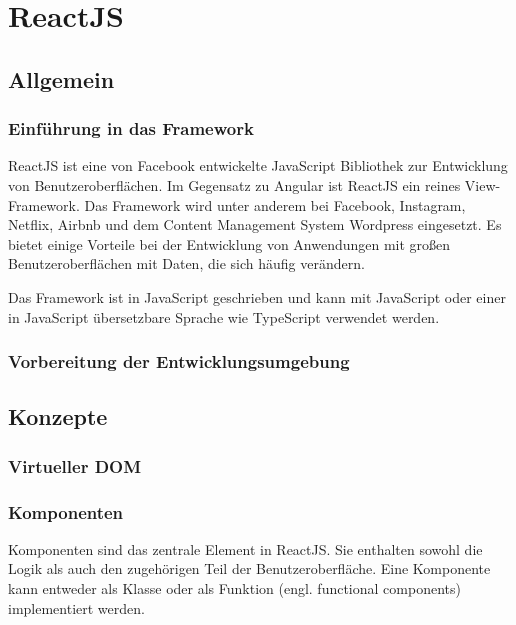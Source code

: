 \chapter{ReactJS}
\label{ch:reactJS}

\section{Allgemein}

\subsection{Einführung in das Framework}

ReactJS ist eine von Facebook entwickelte JavaScript Bibliothek zur Entwicklung von Benutzeroberflächen. Im Gegensatz zu Angular ist ReactJS ein reines View-Framework. Das Framework wird unter anderem bei Facebook, Instagram, Netflix, Airbnb und dem Content Management System Wordpress eingesetzt. Es bietet einige Vorteile bei der Entwicklung von Anwendungen mit großen Benutzeroberflächen mit Daten, die sich häufig verändern. 

Das Framework ist in JavaScript geschrieben und kann mit JavaScript oder einer in JavaScript übersetzbare Sprache wie TypeScript verwendet werden.\autocites[vgl.][1\psqq]{Gackenheimer.2015}[vgl.][3\psqq]{Zeigermann.2016}


\subsection{Vorbereitung der Entwicklungsumgebung}



\section{Konzepte}

\subsection{Virtueller DOM}


\subsection{Komponenten}
Komponenten sind das zentrale Element in ReactJS. Sie enthalten sowohl die Logik als auch den zugehörigen Teil der Benutzeroberfläche. Eine Komponente kann entweder als Klasse oder als Funktion (engl. functional components) implementiert werden. %


